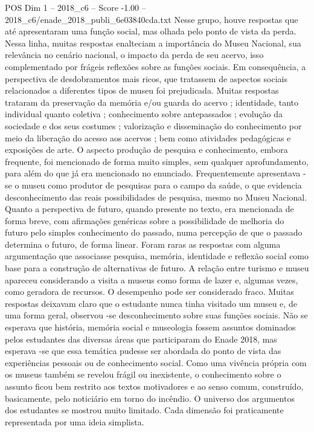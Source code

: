 \begin{textsample}{POS Dim 1 – 2018\_c6 – Score -1.00 – 2018\_c6/enade\_2018\_publi\_6e03840cda.txt}
Nesse grupo, houve respostas que até apresentaram uma função social, mas olhada pelo ponto de vista da perda.
Nessa linha, muitas respostas enalteciam a importância do Museu Nacional, sua relevância no cenário nacional, o impacto da perda de seu acervo, isso complementado por frágeis reflexões sobre as funções sociais.
Em consequência, a perspectiva de desdobramentos mais ricos, que tratassem de aspectos sociais relacionados a diferentes tipos de museu foi prejudicada.
Muitas respostas trataram da preservação da memória e/ou guarda do acervo ; identidade, tanto individual quanto coletiva ; conhecimento sobre antepassados ; evolução da sociedade e dos seus costumes ; valorização e disseminação do conhecimento por meio da liberação do acesso aos acervos ; bem como atividades pedagógicas e exposições de arte.
O aspecto produção de pesquisa e conhecimento, embora frequente, foi mencionado de forma muito simples, sem qualquer aprofundamento, para além do que já era mencionado no enunciado.
Frequentemente apresentava -se o museu como produtor de pesquisas para o campo da saúde, o que evidencia desconhecimento das reais possibilidades de pesquisa, mesmo no Museu Nacional.
Quanto a perspectiva de futuro, quando presente no texto, era mencionada de forma breve, com afirmações genéricas sobre a possibilidade de melhoria do futuro pelo simples conhecimento do passado, numa percepção de que o passado determina o futuro, de forma linear.
Foram raras as respostas com alguma argumentação que associasse pesquisa, memória, identidade e reflexão social como base para a construção de alternativas de futuro.
A relação entre turismo e museu apareceu considerando a visita a museus como forma de lazer e, algumas vezes, como geradora de recursos.
O desempenho pode ser considerado fraco.
Muitas respostas deixavam claro que o estudante nunca tinha visitado um museu e, de uma forma geral, observou -se desconhecimento sobre suas funções sociais.
Não se esperava que história, memória social e museologia fossem assuntos dominados pelos estudantes das diversas áreas que participaram do Enade 2018, mas esperava -se que essa temática pudesse ser abordada do ponto de vista das experiências pessoais ou de conhecimento social.
Como uma vivência própria com os museus também se revelou frágil ou inexistente, o conhecimento sobre o assunto ficou bem restrito aos textos motivadores e ao senso comum, construído, basicamente, pelo noticiário em torno do incêndio.
O universo dos argumentos dos estudantes se mostrou muito limitado.
Cada dimensão foi praticamente representada por uma ideia simplista.

\end{textsample}
